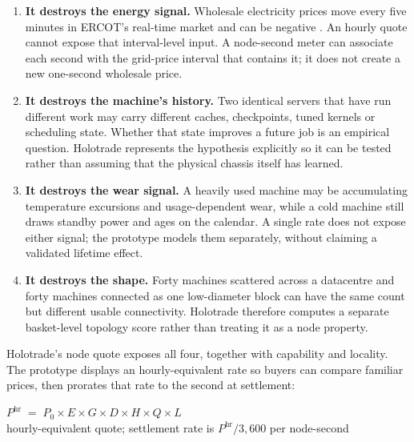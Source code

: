 \documentclass[11pt,letterpaper]{article}
\begin{document}
\begin{enumerate}[leftmargin=1.4em,itemsep=4pt]
\item \textbf{It destroys the energy signal.} Wholesale electricity prices move
every five minutes in ERCOT's real-time market and can be negative
\cite{ercotrtm}. An hourly quote cannot expose that interval-level input. A
node-second meter can associate each second with the grid-price interval that
contains it; it does not create a new one-second wholesale price.

\item \textbf{It destroys the machine's history.} Two identical servers that
have run different work may carry different caches, checkpoints, tuned kernels
or scheduling state. Whether that state improves a future job is an empirical
question. Holotrade represents the hypothesis explicitly so it can be tested
rather than assuming that the physical chassis itself has learned.

\item \textbf{It destroys the wear signal.} A heavily used machine may be
accumulating temperature excursions and usage-dependent wear, while a cold
machine still draws standby power and ages on the calendar. A single rate does
not expose either signal; the prototype models them separately, without
claiming a validated lifetime effect.

\item \textbf{It destroys the shape.} Forty machines scattered across a
datacentre and forty machines connected as one low-diameter block can have the
same count but different usable connectivity. Holotrade therefore computes a
separate basket-level topology score rather than treating it as a node property.
\end{enumerate}

Holotrade's node quote exposes all four, together with capability and locality.
The prototype displays an hourly-equivalent rate so buyers can compare familiar
prices, then prorates that rate to the second at settlement:

\begin{center}
\begin{tcolorbox}[enhanced,colback=white,colframe=navy,boxrule=1pt,arc=2pt,width=0.9\textwidth,halign=center]
{\Large $P^{\mathrm{hr}} \;=\; P_0 \times E \times G \times D \times H \times Q \times L$}\\[4pt]
{\footnotesize\color{grey}hourly-equivalent quote; settlement rate is $P^{\mathrm{hr}}/3{,}600$ per node-second}
\end{tcolorbox}
\end{center}
\end{document}
